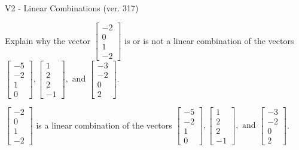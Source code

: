 \begin{exercise}
  \begin{exerciseTitle}V2 - Linear Combinations (ver. 317)\end{exerciseTitle}
  \begin{exerciseStatement}
    Explain why the vector \(\left[\begin{array}{c}
-2 \\
0 \\
1 \\
-2
\end{array}\right]\)  is or is not a linear 
	combination of the vectors \(\left[\begin{array}{c}
-5 \\
-2 \\
1 \\
0
\end{array}\right] , \left[\begin{array}{c}
1 \\
2 \\
2 \\
-1
\end{array}\right] , \text{ and } \left[\begin{array}{c}
-3 \\
-2 \\
0 \\
2
\end{array}\right]\).
	


  \end{exerciseStatement}
  \begin{exerciseAnswer}
   \(\left[\begin{array}{c}
-2 \\
0 \\
1 \\
-2
\end{array}\right]\) 
  	 is  
	a linear combination of the vectors \(\left[\begin{array}{c}
-5 \\
-2 \\
1 \\
0
\end{array}\right] , \left[\begin{array}{c}
1 \\
2 \\
2 \\
-1
\end{array}\right] , \text{ and } \left[\begin{array}{c}
-3 \\
-2 \\
0 \\
2
\end{array}\right]\).

	
  


  \end{exerciseAnswer}
\end{exercise}